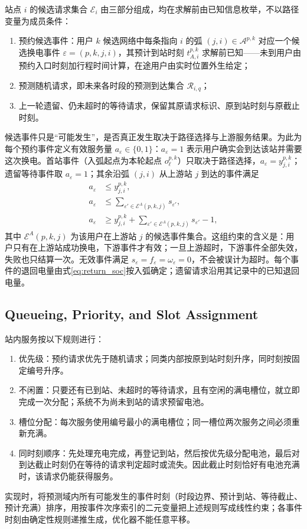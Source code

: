 \documentclass[12pt,a4paper,UTF8]{ctexart}
\begin{document}
站点 $i$ 的候选请求集合 $\mathcal E_i$ 由三部分组成，均在求解前由已知信息枚举，不以路径变量为成员条件：
\begin{enumerate}
  \item 预约候选事件：用户 $k$ 候选网络中每条指向 $i$ 的弧 $(j,i)\in\mathcal A^{p,k}$ 对应一个候选换电事件 $\varepsilon=(p,k,j,i)$，其预计到站时刻 $t_{A,i}^{p,k}$ 求解前已知——未到用户由预约入口时刻加行程时间计算，在途用户由实时位置外生给定；
  \item 预测随机请求，即未来各时段的预测到达集合 $\mathcal R_{i,q}$；
  \item 上一轮遗留、仍未超时的等待请求，保留其原请求标识、原到站时刻与原截止时刻。
\end{enumerate}

候选事件只是“可能发生”，是否真正发生取决于路径选择与上游服务结果。为此为每个预约事件定义有效服务量 $a_\varepsilon\in\{0,1\}$：$a_\varepsilon=1$ 表示用户确实会到达该站并需要这次换电。首站事件（入弧起点为本轮起点 $o_\ell^{p,k}$）只取决于路径选择，$a_\varepsilon=y_{j,i}^{p,k}$；遗留等待事件取 $a_\varepsilon=1$；其余沿弧 $(j,i)$ 从上游站 $j$ 到达的事件满足
\begin{subequations}
\label{eq:reservation_alive_chain}
\begin{align}
a_\varepsilon&\le y_{j,i}^{p,k},\\
a_\varepsilon&\le
\sum_{\varepsilon'\in\mathcal E^A(p,k,j)}s_{\varepsilon'},\\
a_\varepsilon&\ge y_{j,i}^{p,k}
+\sum_{\varepsilon'\in\mathcal E^A(p,k,j)}s_{\varepsilon'}-1,
\end{align}
\end{subequations}
其中 $\mathcal E^A(p,k,j)$ 为该用户在上游站 $j$ 的候选事件集合。这组约束的含义是：用户只有在上游站成功换电，下游事件才有效；一旦上游超时，下游事件全部失效，失败也只结算一次。无效事件满足 $s_\varepsilon=f_\varepsilon=\omega_\varepsilon=0$，不会被误计为超时。每个事件的退回电量由式\eqref{eq:return_soc}按入弧确定；遗留请求沿用其记录中的已知退回电量。

\subsection{Queueing, Priority, and Slot Assignment}

站内服务按以下规则进行：
\begin{enumerate}
  \item 优先级：预约请求优先于随机请求；同类内部按原到站时刻升序，同时刻按固定编号升序。
  \item 不闲置：只要还有已到站、未超时的等待请求，且有空闲的满电槽位，就立即完成一次分配；系统不为尚未到站的请求预留电池。
  \item 槽位分配：每次服务使用编号最小的满电槽位；同一槽位两次服务之间必须重新充满。
  \item 同时刻顺序：先处理充电完成，再登记到站，然后按优先级分配电池，最后对到达截止时刻仍在等待的请求判定超时或流失。因此截止时刻恰好有电池充满时，该请求仍能获得服务。
\end{enumerate}
实现时，将预测域内所有可能发生的事件时刻（时段边界、预计到站、等待截止、预计充满）排序，用按事件次序索引的二元变量把上述规则写成线性约束；各事件时刻由确定性规则递推生成，优化器不能任意平移。
\end{document}
